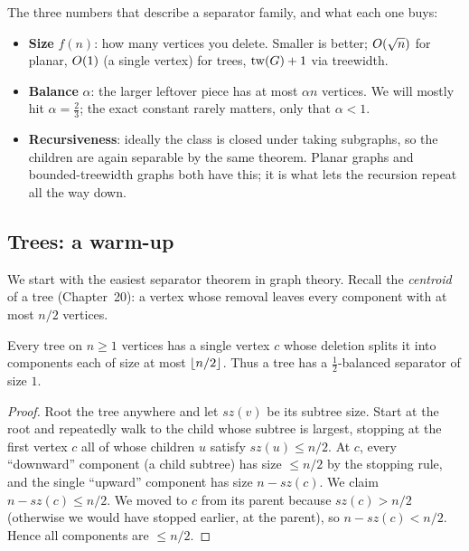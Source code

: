 \begin{focusbox}
The three numbers that describe a separator family, and what each one buys:
\begin{itemize}
  \item \textbf{Size} $f(n)$: how many vertices you delete. Smaller is better; $O(\sqrt n)$ for planar, $O(1)$ (a single vertex) for trees, $\operatorname{tw}(G)+1$ via treewidth.
  \item \textbf{Balance} $\alpha$: the larger leftover piece has at most $\alpha n$ vertices. We will mostly hit $\alpha=\tfrac23$; the exact constant rarely matters, only that $\alpha<1$.
  \item \textbf{Recursiveness}: ideally the class is closed under taking subgraphs, so the children are again separable by the same theorem. Planar graphs and bounded-treewidth graphs both have this; it is what lets the recursion repeat all the way down.
\end{itemize}
\end{focusbox}

\subsection{Trees: a warm-up}

We start with the easiest separator theorem in graph theory. Recall the \emph{centroid} of a tree (Chapter~20): a vertex whose removal leaves every component with at most $n/2$ vertices.

\begin{theorem}\label{ch27:thm-tree}
Every tree on $n\ge 1$ vertices has a single vertex $c$ whose deletion splits it into components each of size at most $\lfloor n/2\rfloor$. Thus a tree has a $\tfrac12$-balanced separator of size $1$.
\end{theorem}

\begin{proof}
Root the tree anywhere and let $\textit{sz}(v)$ be its subtree size. Start at the root and repeatedly walk to the child whose subtree is largest, stopping at the first vertex $c$ all of whose children $u$ satisfy $\textit{sz}(u)\le n/2$. At $c$, every ``downward'' component (a child subtree) has size $\le n/2$ by the stopping rule, and the single ``upward'' component has size $n-\textit{sz}(c)$. We claim $n-\textit{sz}(c)\le n/2$. We moved to $c$ from its parent because $\textit{sz}(c)>n/2$ (otherwise we would have stopped earlier, at the parent), so $n-\textit{sz}(c)<n/2$. Hence all components are $\le n/2$.
\end{proof}

